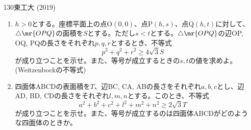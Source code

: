 \begin{thm}{130}{}{東工大 (2019)}
 \begin{enumerate}
  \item $h>0$とする。座標平面上の点O$(0,0)$、点P$(h,s)$、点Q$(h,t)$に対して、$\triangle\mr{OPQ}$の面積を$S$とする。ただし$s<t$とする。$\triangle\mr{OPQ}$の辺OP, OQ, PQの長さをそれぞれ$p, q, r$とするとき、不等式
	\[ p^2+q^2+r^2\ge 4\sqrt{3}S \]
	が成り立つことを示せ。また、等号が成立するときの$s, t$の値を求めよ。 (Weitzenbockの不等式)
  \item 四面体ABCDの表面積を$T$、辺BC, CA, ABの長さをそれぞれ$a, b, c$とし、辺AD, BD, CDの長さをそれぞれ$l, m, n$とする。このとき、不等式
	\[a^2+b^2+c^2+l^2+m^2+n^2 \ge 2\sqrt{3}T \]
	が成り立つことを示せ。また、等号が成立するのは四面体ABCDがどのような四面体のときか。
 \end{enumerate}
\end{thm}

